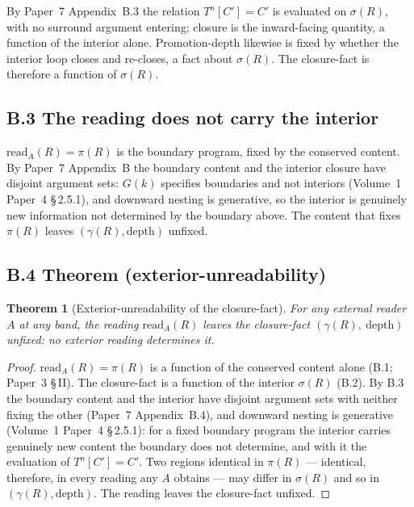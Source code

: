 \documentclass[11pt,oneside]{report}
\newtheorem{theorem}{Theorem}[section]
\theoremstyle{definition}
\theoremstyle{remark}
\begin{document}
By Paper~7 Appendix~B.3 the relation \ensuremath{T^{n}[C'] = C'} is evaluated on \ensuremath{\sigma(R)}, with no surround argument entering; closure is the inward-facing quantity, a function of the interior alone. Promotion-depth likewise is fixed by whether the interior loop closes and re-closes, a fact about \ensuremath{\sigma(R)}. The closure-fact is therefore a function of \ensuremath{\sigma(R)}.

\subsection*{B.3 The reading does not carry the interior}

\ensuremath{\mathrm{read}_A(R) = \pi(R)} is the boundary program, fixed by the conserved content. By Paper~7 Appendix~B the boundary content and the interior closure have disjoint argument sets: \ensuremath{G(k)} specifies boundaries and not interiors (Volume~1 Paper~4 \S\,2.5.1), and downward nesting is generative, so the interior is genuinely new information not determined by the boundary above. The content that fixes \ensuremath{\pi(R)} leaves \ensuremath{(\gamma(R), \text{depth})} unfixed.

\subsection*{B.4 Theorem (exterior-unreadability)}

\begin{theorem}[Exterior-unreadability of the closure-fact]
For any external reader \ensuremath{A} at any band, the reading \ensuremath{\mathrm{read}_A(R)} leaves the closure-fact \ensuremath{(\gamma(R),\ \text{depth})} unfixed: no exterior reading determines it.
\end{theorem}

\begin{proof}
\ensuremath{\mathrm{read}_A(R) = \pi(R)} is a function of the conserved content alone (B.1; Paper~3 \S\,II). The closure-fact is a function of the interior \ensuremath{\sigma(R)} (B.2). By B.3 the boundary content and the interior have disjoint argument sets with neither fixing the other (Paper~7 Appendix~B.4), and downward nesting is generative (Volume~1 Paper~4 \S\,2.5.1): for a fixed boundary program the interior carries genuinely new content the boundary does not determine, and with it the evaluation of \ensuremath{T^{n}[C'] = C'}. Two regions identical in \ensuremath{\pi(R)} --- identical, therefore, in every reading any \ensuremath{A} obtains --- may differ in \ensuremath{\sigma(R)} and so in \ensuremath{(\gamma(R), \text{depth})}. The reading leaves the closure-fact unfixed.
\end{proof}
\end{document}
